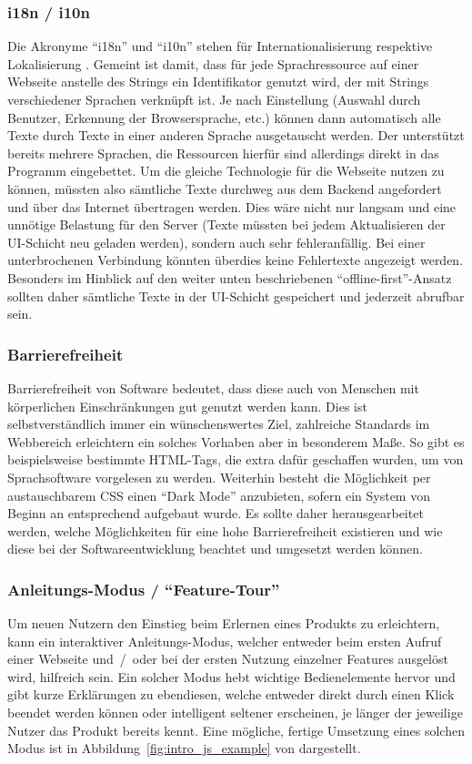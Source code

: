 \subsubsection{i18n / i10n}
Die Akronyme ``i18n'' und ``i10n'' stehen für Internationalisierung respektive Lokalisierung \parencite{i18n_i10n_ishida_w3c_miller_boeing_2018}. Gemeint ist damit, dass für jede Sprachressource auf einer Webseite anstelle des Strings ein Identifikator genutzt wird, der mit Strings verschiedener Sprachen verknüpft ist. Je nach Einstellung (Auswahl durch Benutzer, Erkennung der Browsersprache, etc.) können dann automatisch alle Texte durch Texte in einer anderen Sprache ausgetauscht werden. Der  unterstützt bereits mehrere Sprachen, die Ressourcen hierfür sind allerdings direkt in das Programm eingebettet. Um die gleiche Technologie für die Webseite nutzen zu können, müssten also sämtliche Texte durchweg aus dem Backend angefordert und über das Internet übertragen werden. Dies wäre nicht nur langsam und eine unnötige Belastung für den Server (Texte müssten bei jedem Aktualisieren der UI-Schicht neu geladen werden), sondern auch sehr fehleranfällig. Bei einer unterbrochenen Verbindung könnten überdies keine Fehlertexte angezeigt werden. Besonders im Hinblick auf den weiter unten beschriebenen ``offline-first''-Ansatz sollten daher sämtliche Texte in der UI-Schicht gespeichert und jederzeit abrufbar sein.

\subsubsection{Barrierefreiheit}
Barrierefreiheit von Software bedeutet, dass diese auch von Menschen mit körperlichen Einschränkungen gut genutzt werden kann. Dies ist selbstverständlich immer ein wünschenswertes Ziel, zahlreiche Standards im Webbereich erleichtern ein solches Vorhaben aber in besonderem Maße. So gibt es beispielsweise bestimmte HTML-Tags, die extra dafür geschaffen wurden, um von Sprachsoftware vorgelesen zu werden. Weiterhin besteht die Möglichkeit per austauschbarem CSS einen ``Dark Mode'' anzubieten, sofern ein System von Beginn an entsprechend aufgebaut wurde.
Es sollte daher herausgearbeitet werden, welche Möglichkeiten für eine hohe Barrierefreiheit existieren und wie diese bei der Softwareentwicklung beachtet und umgesetzt werden können.

\subsubsection{Anleitungs-Modus / ``Feature-Tour''}
 Um neuen Nutzern den Einstieg beim Erlernen eines Produkts zu erleichtern, kann ein interaktiver Anleitungs-Modus, welcher entweder beim ersten Aufruf einer Webseite und~/~oder bei der ersten Nutzung einzelner Features ausgelöst wird, hilfreich sein. Ein solcher Modus hebt wichtige Bedienelemente hervor und gibt kurze Erklärungen zu ebendiesen, welche entweder direkt durch einen Klick beendet werden können oder intelligent seltener erscheinen, je länger der jeweilige Nutzer das Produkt bereits kennt. Eine mögliche, fertige Umsetzung eines solchen Modus ist in Abbildung~\ref{fig:intro_js_example} von  dargestellt.

